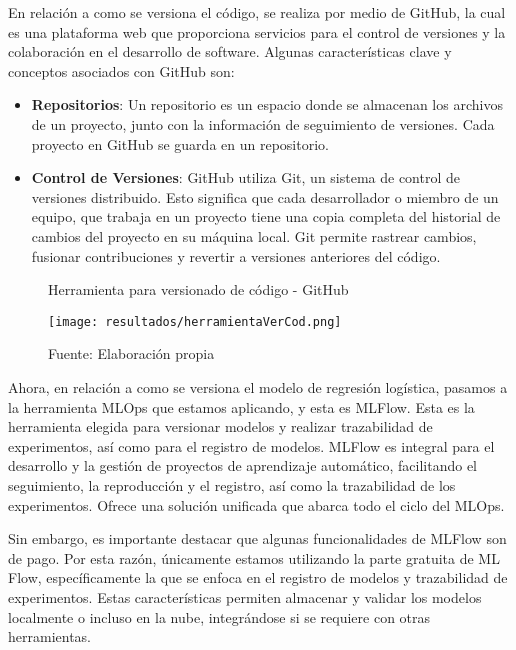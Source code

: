 En relación a como se versiona el código, se realiza por medio de GitHub, la cual es una plataforma web que proporciona servicios para el control de versiones y la colaboración en el desarrollo de software. Algunas características clave y conceptos asociados con GitHub son:

\begin{itemize}
    \item \textbf{Repositorios}: Un repositorio es un espacio donde se almacenan los archivos de un proyecto, junto con la información de seguimiento de versiones. Cada proyecto en GitHub se guarda en un repositorio.
    \item \textbf{Control de Versiones}: GitHub utiliza Git, un sistema de control de versiones distribuido. Esto significa que cada desarrollador o miembro de un equipo, que trabaja en un proyecto tiene una copia completa del historial de cambios del proyecto en su máquina local. Git permite rastrear cambios, fusionar contribuciones y revertir a versiones anteriores del código.
\end{itemize}

\newpage

\begin{figure}[h]
\centering
\caption{Herramienta para versionado de código - GitHub}
\texttt{[image: resultados/herramientaVerCod.png]}
\caption*{\footnotesize Fuente: Elaboración propia}
\label{fig:figuraHerramientaVerCod}
\end{figure}

Ahora, en relación a como se versiona el modelo de regresión logística, pasamos a la herramienta MLOps que estamos aplicando, y esta es MLFlow. Esta es la herramienta elegida para versionar modelos y realizar trazabilidad de experimentos, así como para el registro de modelos. MLFlow es integral para el desarrollo y la gestión de proyectos de aprendizaje automático, facilitando el seguimiento, la reproducción y el registro, así como la trazabilidad de los experimentos. Ofrece una solución unificada que abarca todo el ciclo del MLOps. \newline

Sin embargo, es importante destacar que algunas funcionalidades de MLFlow son de pago. Por esta razón, únicamente estamos utilizando la parte gratuita de ML Flow, específicamente la que se enfoca en el registro de modelos y trazabilidad de experimentos. Estas características permiten almacenar y validar los modelos localmente o incluso en la nube, integrándose si se requiere con otras herramientas.

